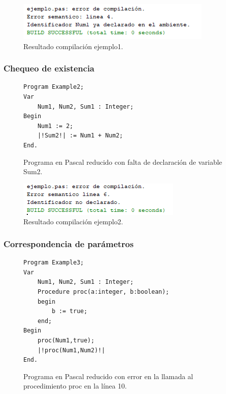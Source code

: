 \begin{figure}[H]
\centering
\includegraphics[]{img/semantico/semantico_ej1.png}
\caption{Resultado compilación ejemplo1.}
\label{fig:semantico_ej1}
\end{figure}

\subsubsection{Chequeo de existencia}
\begin{figure}[H]
\begin{verbatim}
Program Example2;
Var       
    Num1, Num2, Sum1 : Integer;
Begin 
    Num1 := 2;
    |!Sum2!| := Num1 + Num2;
End.
\end{verbatim}
\caption{Programa en Pascal reducido con falta de declaración de variable Sum2.}
\label{fig:semantico_ej_error_2}
\end{figure}

\begin{figure}[H]
\centering
\includegraphics[]{img/semantico/semantico_ej2.png}
\caption{Resultado compilación ejemplo2.}
\label{fig:semantico_ej2}
\end{figure}

\subsubsection{Correspondencia de parámetros}
\begin{figure}[H]
\begin{verbatim}
Program Example3;
Var       
    Num1, Num2, Sum1 : Integer;
    Procedure proc(a:integer, b:boolean);
    begin
        b := true;
    end;
Begin
    proc(Num1,true);
    |!proc(Num1,Num2)!|
End.
\end{verbatim}
\caption{Programa en Pascal reducido con error en la llamada al procedimiento proc en la línea 10.}
\label{fig:semantico_ej_error_3}
\end{figure}

